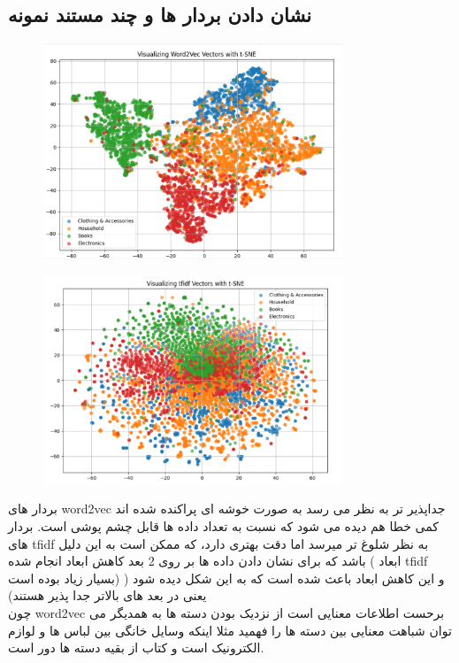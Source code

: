 \documentclass[a4paper,12pt]{article}
\begin{document}
\subsection*{نشان دادن بردار ها و چند مستند نمونه}
\begin{figure}[H]
    \centering
    \includegraphics[width=0.8\textwidth]{word2vec.png}
    \label{fig:yourlabel}
\end{figure}
\begin{figure}[H]
    \centering
    \includegraphics[width=0.8\textwidth]{tfidf.png}
    \label{fig:yourlabel}
\end{figure}
بردار های word2vec جداپذیر تر به نظر می رسد به صورت خوشه ای پراکنده شده اند کمی خطا هم دیده می شود که نسبت به تعداد داده ها قابل چشم پوشی است. بردار های tfidf به نظر شلوغ تر میرسد اما دقت بهتری دارد، که ممکن است به این دلیل باشد که برای نشان دادن داده ها بر روی 2 بعد کاهش ابعاد انجام شده ( ابعاد tfidf بسیار زیاد بوده است) و  این کاهش ابعاد باعث شده است که به این شکل دیده شود ( یعنی در بعد های بالاتر جدا پذیر هستند)
\\
چون word2vec برحست اطلاعات معنایی است از نزدیک بودن دسته ها به همدیگر می توان شباهت معنایی بین دسته ها را فهمید مثلا اینکه وسایل خانگی بین لباس ها و لوازم الکترونیک است و کتاب از بقیه دسته ها دور است.
\end{document}
